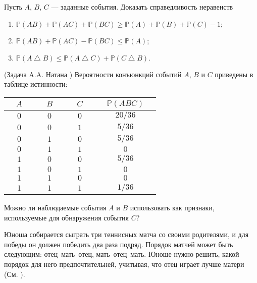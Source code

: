 \begin{problem}
Пусть $A$, $B$, $C$ --- заданные события. Доказать справедливость неравенств 
\begin{enumerate}
\item ${\mathbb P}(AB)+{\mathbb P}(AC)+{\mathbb P}(BC)\geqslant {\mathbb P}(A)+{\mathbb P}(B)+{\mathbb P}(C)-1$; 
\item ${\mathbb P}(AB)+{\mathbb P}(AC)-{\mathbb P}(BC)\leqslant {\mathbb P}(A)$; 
\item ${\mathbb P}(A\bigtriangleup B)\leqslant {\mathbb P}(A\bigtriangleup C)+{\mathbb P}(C\bigtriangleup B).$ 
\end{enumerate}
\end{problem}

\begin{problem}(Задача A.A. Натана \cite{5})
Вероятности конъюнкций событий $A$, $B$ и $C$ приведены в таблице истинности: 
\vspace{0.3cm}

\begin{tabular}{|c|c|c|c|}
\hline
$\quad A\quad$ & $\quad B\quad$ & $\quad C\quad$ & $\quad {\mathbb P}(ABC)\quad$ \\
\hline
$0$ & $0$ & $0$ & $20/36$ \\
\hline
$0$ & $0$ & $1$ & $5/36$ \\
\hline
$0$ & $1$ & $0$ & $5/36$ \\
\hline
$0$ & $1$ & $1$ & $0$ \\
\hline
$1$ & $0$ & $0$ & $5/36$ \\
\hline
$1$ & $0$ & $1$ & $0$ \\
\hline
$1$ & $1$ & $0$ & $0$ \\
\hline
$1$ & $1$ & $1$ & $1/36$ \\
\hline
\end{tabular}

\vspace{0.3cm}

Можно ли наблюдаемые события $A$ и $B$ использовать как признаки, используемые для обнаружения события $C$? 
\end{problem}

\begin{problem}
Юноша собирается сыграть три теннисных матча со своими родителями, и для победы он должен победить два раза подряд. 
Порядок матчей может быть следующим: отец--мать--отец, мать--отец--мать. Юноше нужно решить, какой порядок для него предпочтительней, 
учитывая, что отец играет лучше матери (См. \cite{book12}). 

\end{problem}


